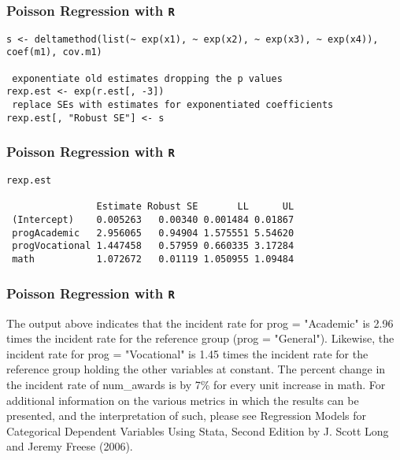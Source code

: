 \documentclass[00-GLMregslides.tex]{subfiles}
\begin{document}
\begin{frame}[fragile]

\frametitle{Poisson Regression with \texttt{R}}
\Large

\begin{framed}
\begin{verbatim}
s <- deltamethod(list(~ exp(x1), ~ exp(x2), ~ exp(x3), ~ exp(x4)), coef(m1), cov.m1)

 exponentiate old estimates dropping the p values
rexp.est <- exp(r.est[, -3])
 replace SEs with estimates for exponentiated coefficients
rexp.est[, "Robust SE"] <- s
\end{verbatim}
\end{framed}
\end{frame}

\begin{frame}[fragile]

\frametitle{Poisson Regression with \texttt{R}}
\Large

\begin{framed}
\begin{verbatim}
rexp.est
 
                Estimate Robust SE       LL      UL
 (Intercept)    0.005263   0.00340 0.001484 0.01867
 progAcademic   2.956065   0.94904 1.575551 5.54620
 progVocational 1.447458   0.57959 0.660335 3.17284
 math           1.072672   0.01119 1.050955 1.09484
\end{verbatim}
\end{framed}
\end{frame}
\begin{frame}[fragile]

\frametitle{Poisson Regression with \texttt{R}}
\Large 
The output above indicates that the incident rate for prog = "Academic" is 2.96 times the incident rate for the reference group (prog = "General"). Likewise, the incident rate for prog = "Vocational" is 1.45 times the incident rate for the reference group holding the other variables at constant. The percent change in the incident rate of num\_awards is by 7\% for every unit increase in math. For additional information on the various metrics in which the results can be presented, and the interpretation of such, please see Regression Models for Categorical Dependent Variables Using Stata, Second Edition by J. Scott Long and Jeremy Freese (2006).
\end{frame}
\end{document}
